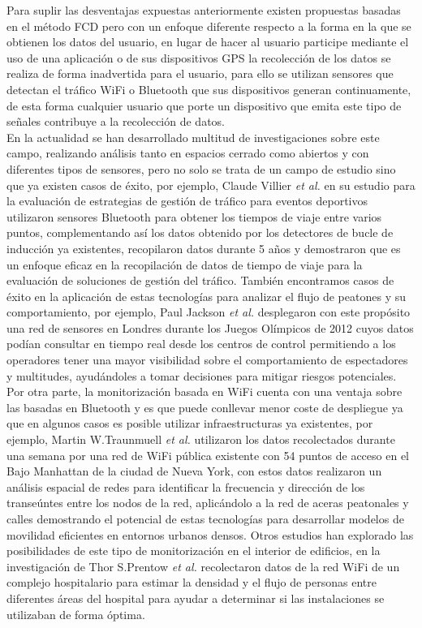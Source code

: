 \documentclass[../proyecto.tex]{subfiles}
\begin{document}
Para suplir las desventajas expuestas anteriormente existen propuestas basadas en el método FCD pero con un enfoque diferente respecto a la forma en la que se obtienen los datos del usuario, en lugar de hacer al usuario participe mediante el uso de una aplicación o de sus dispositivos GPS la recolección de los datos se realiza de forma inadvertida para el usuario, para ello se utilizan sensores que detectan el tráfico WiFi o Bluetooth que sus dispositivos generan continuamente, de esta forma cualquier usuario que porte un dispositivo que emita este tipo de señales contribuye a la recolección de datos.\\

En la actualidad se han desarrollado multitud de investigaciones sobre este campo, realizando análisis tanto en espacios cerrado como abiertos y con diferentes tipos de sensores, pero no solo se trata de un campo de estudio sino que ya existen casos de éxito, por ejemplo, Claude Villier \textit{et al.} en su estudio para la evaluación de estrategias de gestión de tráfico para eventos deportivos \cite{VILLIERS2019100052} utilizaron sensores Bluetooth para obtener los tiempos de viaje entre varios puntos, complementando así los datos obtenido por los detectores de bucle de inducción ya existentes, recopilaron datos durante 5 años y demostraron que es un enfoque eficaz en la recopilación de datos de tiempo de viaje para la evaluación de soluciones de gestión del tráfico. También encontramos casos de éxito en la aplicación de estas tecnologías para analizar el flujo de peatones y su comportamiento, por ejemplo,  Paul Jackson \textit{et al.} \cite{JACKSON2012} desplegaron con este propósito una red de sensores en Londres durante los Juegos Olímpicos de 2012 cuyos datos podían consultar en tiempo real desde los centros de control permitiendo a los operadores tener una mayor visibilidad sobre el comportamiento de espectadores y multitudes, ayudándoles a tomar decisiones para mitigar riesgos potenciales. \\

Por otra parte, la monitorización basada en WiFi cuenta con una ventaja sobre las basadas en Bluetooth y es que puede conllevar menor coste de despliegue ya que en algunos casos es posible utilizar infraestructuras ya existentes, por ejemplo, Martin W.Traunmuell \textit{et al.} \cite{TRAUNMUELLER20184} utilizaron los datos recolectados durante una semana por una red de WiFi pública existente con 54 puntos de acceso en el Bajo Manhattan de la ciudad de Nueva York, con estos datos realizaron un análisis espacial de redes para identificar la frecuencia y dirección de los transeúntes entre los nodos de la red, aplicándolo a la red de aceras peatonales y calles  demostrando el potencial de estas tecnologías para desarrollar modelos de movilidad eficientes en entornos urbanos densos. Otros estudios han explorado las posibilidades de este tipo de monitorización en el interior de edificios, en la investigación de Thor S.Prentow \textit{et al.} \cite{PRENTOW2015305} recolectaron datos de la red WiFi de un complejo hospitalario para estimar la densidad y el flujo de personas entre diferentes áreas del hospital para ayudar a determinar si las instalaciones se utilizaban de forma óptima.\\
\end{document}

